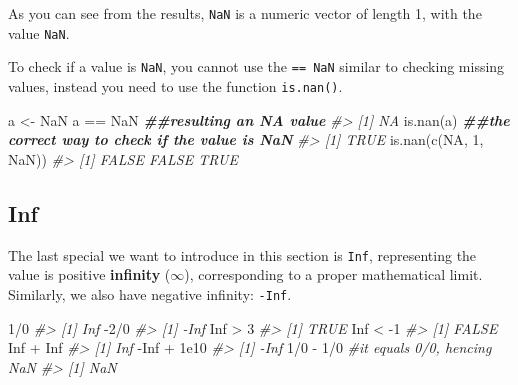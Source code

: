 \documentclass[
]{book}
\newenvironment{Shaded}{\begin{snugshade}}{\end{snugshade}}
\newcommand{\CommentTok}[1]{\textcolor[rgb]{0.56,0.35,0.01}{\textit{#1}}}
\newcommand{\ConstantTok}[1]{\textcolor[rgb]{0.00,0.00,0.00}{#1}}
\newcommand{\DecValTok}[1]{\textcolor[rgb]{0.00,0.00,0.81}{#1}}
\newcommand{\DocumentationTok}[1]{\textcolor[rgb]{0.56,0.35,0.01}{\textbf{\textit{#1}}}}
\newcommand{\FloatTok}[1]{\textcolor[rgb]{0.00,0.00,0.81}{#1}}
\newcommand{\FunctionTok}[1]{\textcolor[rgb]{0.00,0.00,0.00}{#1}}
\newcommand{\NormalTok}[1]{#1}
\newcommand{\OtherTok}[1]{\textcolor[rgb]{0.56,0.35,0.01}{#1}}
\newcommand{\SpecialCharTok}[1]{\textcolor[rgb]{0.00,0.00,0.00}{#1}}
\begin{document}
As you can see from the results, \texttt{NaN} is a numeric vector of length 1, with the value \texttt{NaN}.

To check if a value is \texttt{NaN}, you cannot use the \texttt{==\ NaN} similar to checking missing values, instead you need to use the function \texttt{is.nan()}.

\begin{Shaded}
\begin{Highlighting}[]
\NormalTok{a }\OtherTok{\textless{}{-}} \ConstantTok{NaN}
\NormalTok{a }\SpecialCharTok{==} \ConstantTok{NaN}       \DocumentationTok{\#\#resulting an NA value}
\CommentTok{\#\textgreater{} [1] NA}
\FunctionTok{is.nan}\NormalTok{(a)      }\DocumentationTok{\#\#the correct way to check if the value is NaN}
\CommentTok{\#\textgreater{} [1] TRUE}
\FunctionTok{is.nan}\NormalTok{(}\FunctionTok{c}\NormalTok{(}\ConstantTok{NA}\NormalTok{, }\DecValTok{1}\NormalTok{, }\ConstantTok{NaN}\NormalTok{))}
\CommentTok{\#\textgreater{} [1] FALSE FALSE  TRUE}
\end{Highlighting}
\end{Shaded}

\hypertarget{Inf}{%
\subsection{Inf}\label{Inf}}

The last special we want to introduce in this section is \texttt{Inf}, representing the value is positive \textbf{infinity} (\(\infty\)), corresponding to a proper mathematical limit. Similarly, we also have negative infinity: \texttt{-Inf}.

\begin{Shaded}
\begin{Highlighting}[]
\DecValTok{1}\SpecialCharTok{/}\DecValTok{0}
\CommentTok{\#\textgreater{} [1] Inf}
\SpecialCharTok{{-}}\DecValTok{2}\SpecialCharTok{/}\DecValTok{0}
\CommentTok{\#\textgreater{} [1] {-}Inf}
\ConstantTok{Inf} \SpecialCharTok{\textgreater{}} \DecValTok{3}
\CommentTok{\#\textgreater{} [1] TRUE}
\ConstantTok{Inf} \SpecialCharTok{\textless{}} \SpecialCharTok{{-}}\DecValTok{1}
\CommentTok{\#\textgreater{} [1] FALSE}
\ConstantTok{Inf} \SpecialCharTok{+} \ConstantTok{Inf}
\CommentTok{\#\textgreater{} [1] Inf}
\SpecialCharTok{{-}}\ConstantTok{Inf} \SpecialCharTok{+} \FloatTok{1e10}
\CommentTok{\#\textgreater{} [1] {-}Inf}
\DecValTok{1}\SpecialCharTok{/}\DecValTok{0} \SpecialCharTok{{-}} \DecValTok{1}\SpecialCharTok{/}\DecValTok{0}        \CommentTok{\#it equals 0/0, hencing NaN}
\CommentTok{\#\textgreater{} [1] NaN}
\end{Highlighting}
\end{Shaded}
\end{document}

